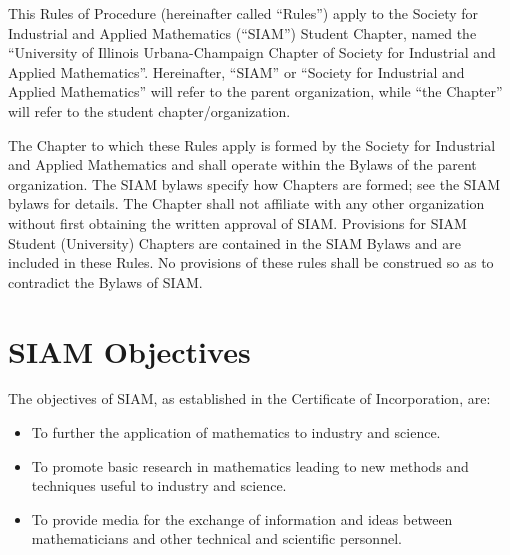 \documentclass{ronr-bylaws}
\author{Nicolas Nytko}
\date{\today}
\begin{document}
%
%
\maketitlepage
%
%
\tableofcontents
\newpage
%
\maketitle
This Rules of Procedure (hereinafter called ``Rules'') apply to the Society for Industrial and Applied Mathematics (``SIAM'') Student Chapter, named the ``University of Illinois Urbana-Champaign Chapter of Society for Industrial and Applied Mathematics''.  Hereinafter, ``SIAM'' or ``Society for Industrial and Applied Mathematics'' will refer to the parent organization, while ``the Chapter'' will refer to the student chapter/organization.

The Chapter to which these Rules apply is formed by the Society for Industrial and Applied
Mathematics and shall operate within the Bylaws of the parent organization. The SIAM bylaws
specify how Chapters are formed; see the SIAM bylaws for details. The Chapter shall not affiliate
with any other organization without first obtaining the written approval of SIAM. Provisions for
SIAM  Student (University) Chapters are contained in the SIAM Bylaws and are included in these
Rules. No provisions of these rules shall be construed so as to contradict the Bylaws of SIAM.
\section{SIAM Objectives}
The objectives of SIAM, as established in the Certificate of Incorporation, are:
\begin{itemize}
\item To further the application of mathematics to industry and science.
\item To promote basic research in mathematics leading to new methods and techniques useful to industry and science.
\item To provide media for the exchange of information and ideas between mathematicians and other technical and scientific personnel.
\end{itemize}
\end{document}
